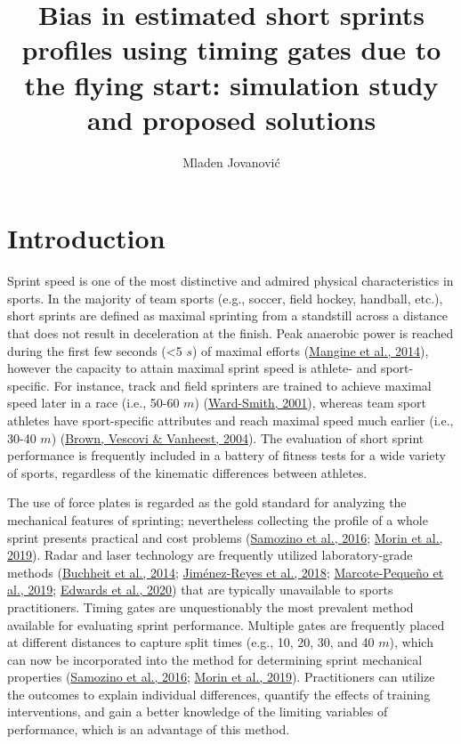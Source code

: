 \documentclass[fleqn,10pt]{wlpeerj} %
\title{Bias in estimated short sprints profiles using timing gates due to the flying start: simulation study and proposed solutions}
\author[1]{Mladen Jovanović}
\affil[1]{Faculty of Sport and Physical Education, University of Belgrade, Serbia}
\begin{document}
\flushbottom
\maketitle
\thispagestyle{empty}

\hypertarget{introduction}{%
\section{Introduction}\label{introduction}}

Sprint speed is one of the most distinctive and admired physical characteristics in sports. In the majority of team sports (e.g., soccer, field hockey, handball, etc.), short sprints are defined as maximal sprinting from a standstill across a distance that does not result in deceleration at the finish. Peak anaerobic power is reached during the first few seconds (\textless5 \(s\)) of maximal efforts (\protect\hyperlink{ref-mangineSpeedForcePower2014}{Mangine et al., 2014}), however the capacity to attain maximal sprint speed is athlete- and sport-specific. For instance, track and field sprinters are trained to achieve maximal speed later in a race (i.e., 50-60 \(m\)) (\protect\hyperlink{ref-ward-smithEnergyConversionStrategies2001}{Ward-Smith, 2001}), whereas team sport athletes have sport-specific attributes and reach maximal speed much earlier (i.e., 30-40 \(m\)) (\protect\hyperlink{ref-brownAssessmentLinearSprinting2004}{Brown, Vescovi \& Vanheest, 2004}). The evaluation of short sprint performance is frequently included in a battery of fitness tests for a wide variety of sports, regardless of the kinematic differences between athletes.

The use of force plates is regarded as the gold standard for analyzing the mechanical features of sprinting; nevertheless collecting the profile of a whole sprint presents practical and cost problems (\protect\hyperlink{ref-samozinoSimpleMethodMeasuring2016}{Samozino et al., 2016}; \protect\hyperlink{ref-morinSimpleMethodComputing2019}{Morin et al., 2019}). Radar and laser technology are frequently utilized laboratory-grade methods (\protect\hyperlink{ref-buchheitMechanicalDeterminantsAcceleration2014}{Buchheit et al., 2014}; \protect\hyperlink{ref-jimenez-reyesRelationshipVerticalHorizontal2018}{Jiménez-Reyes et al., 2018}; \protect\hyperlink{ref-marcote-pequenoAssociationForceVelocity2019}{Marcote-Pequeño et al., 2019}; \protect\hyperlink{ref-edwardsSprintAccelerationCharacteristics2020}{Edwards et al., 2020}) that are typically unavailable to sports practitioners. Timing gates are unquestionably the most prevalent method available for evaluating sprint performance. Multiple gates are frequently placed at different distances to capture split times (e.g., 10, 20, 30, and 40 \(m\)), which can now be incorporated into the method for determining sprint mechanical properties (\protect\hyperlink{ref-samozinoSimpleMethodMeasuring2016}{Samozino et al., 2016}; \protect\hyperlink{ref-morinSimpleMethodComputing2019}{Morin et al., 2019}). Practitioners can utilize the outcomes to explain individual differences, quantify the effects of training interventions, and gain a better knowledge of the limiting variables of performance, which is an advantage of this method.
\end{document}
